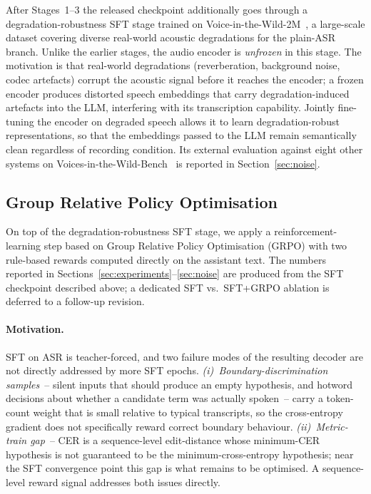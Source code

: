 After Stages~1--3 the released checkpoint additionally goes through
a degradation-robustness SFT stage trained on Voice-in-the-Wild-2M~\cite{xie2026mega},
a large-scale dataset covering diverse real-world acoustic degradations
for the plain-ASR branch. Unlike the earlier stages, the audio encoder
is \emph{unfrozen} in this stage. The motivation is that real-world
degradations (reverberation, background noise, codec artefacts) corrupt
the acoustic signal before it reaches the encoder; a frozen encoder
produces distorted speech embeddings that carry degradation-induced
artefacts into the LLM, interfering with its transcription capability.
Jointly fine-tuning the encoder on degraded speech allows it to learn
degradation-robust representations, so that the embeddings passed to
the LLM remain semantically clean regardless of recording condition.
Its external evaluation against eight other systems on
Voices-in-the-Wild-Bench~\cite{xie2026mega} is reported in
Section~\ref{sec:noise}.

\subsection{Group Relative Policy Optimisation}
\label{subsec:grpo}

On top of the degradation-robustness SFT stage, we apply a
reinforcement-learning step based on Group Relative Policy
Optimisation (GRPO) \cite{lakomkin2025contextual} with two
rule-based rewards computed directly on the assistant text. The
numbers reported in Sections~\ref{sec:experiments}--\ref{sec:noise}
are produced from the SFT checkpoint described above; a dedicated
SFT vs.\ SFT+GRPO ablation is deferred to a follow-up revision.

\paragraph{Motivation.}
SFT on ASR is teacher-forced, and two failure modes of the resulting
decoder are not directly addressed by more SFT epochs.
\emph{(i)~Boundary-discrimination samples}~-- silent inputs that
should produce an empty hypothesis, and hotword decisions about
whether a candidate term was actually spoken~-- carry a token-count
weight that is small relative to typical transcripts, so the
cross-entropy gradient does not specifically reward correct boundary
behaviour. \emph{(ii)~Metric-train gap}~-- CER is a sequence-level
edit-distance whose minimum-CER hypothesis is not guaranteed to be
the minimum-cross-entropy hypothesis; near the SFT convergence point
this gap is what remains to be optimised. A sequence-level reward
signal addresses both issues directly.

